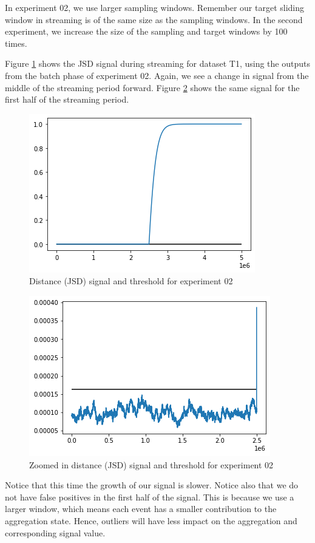 In experiment 02, we use larger sampling windows. Remember our target sliding window in streaming is of the same size as the sampling windows. In the second experiment, we increase the size of the sampling and target windows by 100 times.

Figure \ref{fig:JSD-signal-02} shows the JSD signal during streaming for dataset T1, using the outputs from the batch phase of experiment 02. Again, we see a change in signal from the middle of the streaming period forward. Figure \ref{fig:JSD-signal-zoom-02} shows the same signal for the first half of the streaming period.
\begin{figure}[!htb]
    \begin{center}
      \includegraphics[scale=0.6]{figures/stream-analysis-viz-62500.png}
      \caption[]{Distance (JSD) signal and threshold for experiment 02}
      \label{fig:JSD-signal-02}
    \end{center}
\end{figure}
\begin{figure}[!htb]
    \begin{center}
      \includegraphics[scale=0.6]{figures/stream-analysis-viz-zoom-62500.png}
      \caption[]{Zoomed in distance (JSD) signal and threshold for experiment 02}
      \label{fig:JSD-signal-zoom-02}
    \end{center}
\end{figure}
Notice that this time the growth of our signal is slower. Notice also that we do not have false positives in the first half of the signal. This is because we use a larger window, which means each event has a smaller contribution to the aggregation state. Hence, outliers will have less impact on the aggregation and corresponding signal value.


